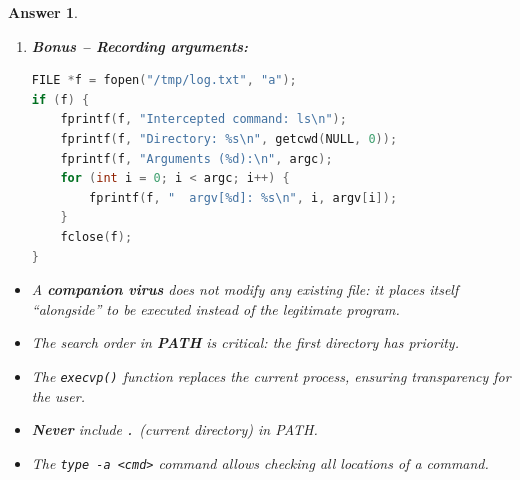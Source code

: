 \documentclass[a4paper,11pt]{article}
\theoremstyle{plain}
\newtheorem{correction}{Answer}
\theoremstyle{definition}
\begin{document}
\begin{correction}
\begin{enumerate}
\textbf{Other countermeasures:}
\begin{itemize}
\item Enable SELinux or AppArmor
\item Monitor modifications to \texttt{.bashrc} and \texttt{.profile}
\item Use \texttt{type -a ls} to see all available \texttt{ls} commands
\end{itemize}

\item \textbf{Bonus -- Recording arguments:}

\begin{lstlisting}[language=C]
FILE *f = fopen("/tmp/log.txt", "a");
if (f) {
    fprintf(f, "Intercepted command: ls\n");
    fprintf(f, "Directory: %s\n", getcwd(NULL, 0));
    fprintf(f, "Arguments (%d):\n", argc);
    for (int i = 0; i < argc; i++) {
        fprintf(f, "  argv[%d]: %s\n", i, argv[i]);
    }
    fclose(f);
}
\end{lstlisting}

\end{enumerate}

\begin{pointcle}
\begin{itemize}
    \item A \textbf{companion virus} does not modify any existing file: it places itself ``alongside'' to be executed instead of the legitimate program.
    \item The search order in \textbf{PATH} is critical: the first directory has priority.
    \item The \texttt{execvp()} function replaces the current process, ensuring transparency for the user.
    \item \textbf{Never} include \texttt{.} (current directory) in PATH.
    \item The \texttt{type -a <cmd>} command allows checking all locations of a command.
\end{itemize}
\end{pointcle}

\end{correction}

\bigskip

\end{document}
